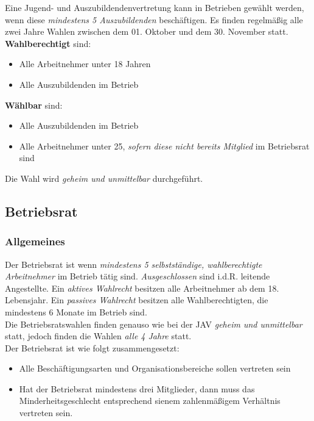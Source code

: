 \documentclass[a4paper, 12pt]{report}
\begin{document}
Eine Jugend- und Auszubildendenvertretung kann in Betrieben gewählt werden, 
wenn diese \emph{mindestens 5 Auszubildenden} beschäftigen. Es finden 
regelmäßig alle zwei Jahre  Wahlen zwischen dem 01. Oktober und dem 30. November
statt. \\

\textbf{Wahlberechtigt} sind: 

\begin{itemize}
    \item Alle Arbeitnehmer unter 18 Jahren
    \item Alle Auszubildenden im Betrieb
\end{itemize}

\textbf{Wählbar} sind: 
\begin{itemize}
    \item Alle Auszubildenden im Betrieb
    \item Alle Arbeitnehmer unter 25, \emph{sofern diese nicht bereits Mitglied}
        im Betriebsrat sind
\end{itemize}

Die Wahl wird \emph{geheim und unmittelbar} durchgeführt.

\newpage
\subsection{Betriebsrat}

\subsubsection{Allgemeines}

Der Betriebsrat ist wenn \emph{mindestens 5 selbstständige, wahlberechtigte 
Arbeitnehmer} im Betrieb tätig sind. \emph{Ausgeschlossen} sind i.d.R. leitende 
Angestellte. Ein \emph{aktives Wahlrecht} besitzen alle Arbeitnehmer ab dem 18.
Lebensjahr. Ein \emph{passives Wahlrecht} besitzen alle Wahlberechtigten, die 
mindestens 6 Monate im Betrieb sind. \\

Die Betriebsratswahlen finden genauso wie bei der JAV \emph{geheim und 
unmittelbar} statt, jedoch finden die Wahlen \emph{alle 4 Jahre} statt. \\

Der Betriebsrat ist wie folgt zusammengesetzt: 

\begin{itemize}
    \item Alle Beschäftigungsarten und Organisationsbereiche sollen vertreten 
        sein
    \item Hat der Betriebsrat mindestens drei Mitglieder, dann muss das 
        Minderheitsgeschlecht entsprechend sienem zahlenmäßigem Verhältnis 
        vertreten sein. 
\end{itemize}
\end{document}
